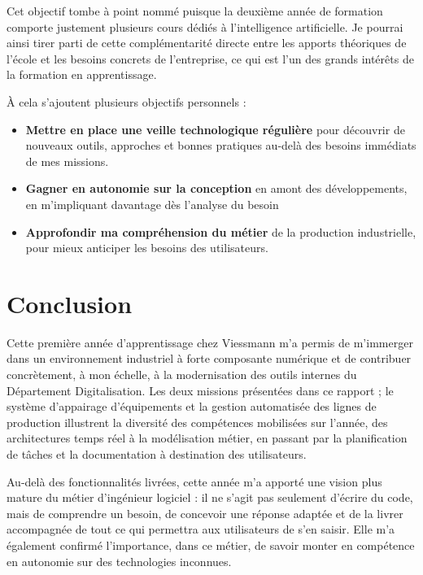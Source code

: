 \documentclass[pe1a]{tnreport} %
\begin{document}
Cet objectif tombe à point nommé puisque la deuxième année de formation 
comporte justement plusieurs cours dédiés à l'intelligence artificielle. 
Je pourrai ainsi tirer parti de cette complémentarité directe entre les 
apports théoriques de l'école et les besoins concrets de l'entreprise, ce 
qui est l'un des grands intérêts de la formation en apprentissage.

À cela s'ajoutent plusieurs objectifs personnels :
\begin{itemize}
    \item \textbf{Mettre en place une veille technologique régulière} pour 
    découvrir de nouveaux outils, approches et bonnes pratiques au-delà des 
    besoins immédiats de mes missions.
    \item \textbf{Gagner en autonomie sur la conception} en amont des 
    développements, en m'impliquant davantage dès l'analyse du besoin
    \item \textbf{Approfondir ma compréhension du métier} de la production 
    industrielle, pour mieux anticiper les besoins des utilisateurs.
\end{itemize}

\cleardoublepage

\chapter{Conclusion}

Cette première année d'apprentissage chez Viessmann m'a permis de 
m'immerger dans un environnement industriel à forte composante numérique 
et de contribuer concrètement, à mon échelle, à la modernisation des 
outils internes du Département Digitalisation. Les deux missions 
présentées dans ce rapport ; le système d'appairage d'équipements et la 
gestion automatisée des lignes de production illustrent la diversité 
des compétences mobilisées sur l'année, des architectures temps réel à 
la modélisation métier, en passant par la planification de tâches et la 
documentation à destination des utilisateurs.

Au-delà des fonctionnalités livrées, cette année m'a apporté une vision 
plus mature du métier d'ingénieur logiciel : il ne s'agit pas seulement 
d'écrire du code, mais de comprendre un besoin, de concevoir une réponse 
adaptée et de la livrer accompagnée de tout ce qui permettra aux 
utilisateurs de s'en saisir. Elle m'a également confirmé l'importance, 
dans ce métier, de savoir monter en compétence en autonomie sur des 
technologies inconnues.
\end{document}

